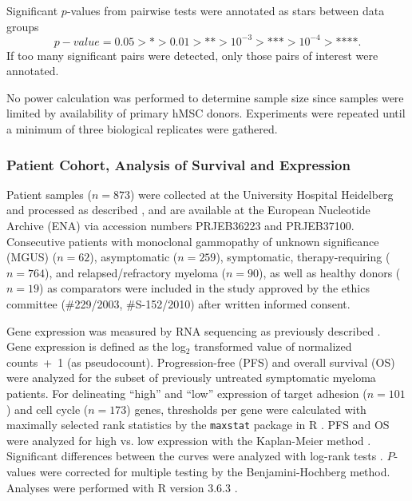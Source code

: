 Significant \(p\)-values from pairwise tests were annotated as stars between
data groups
\[ p-value = 0.05 > \text{*} > 0.01 > \text{**} > 10^{-3} >
    \text{***}> 10^{-4} > \text{****}. \]
If too many significant pairs were
detected, only those pairs of interest were annotated.

No power calculation was performed to determine sample size since samples were
limited by availability of primary hMSC donors. Experiments were repeated until
a minimum of three biological replicates were gathered.


\subsubsection*{Patient Cohort, Analysis of Survival and Expression}
Patient samples (\(n=873\)) were collected at the University Hospital Heidelberg
and processed as described
\cite{seckingerTargetExpressionGeneration2017b,seckingerCD38ImmunotherapeuticTarget2018},
and are available at the European Nucleotide Archive (ENA) via accession numbers
PRJEB36223 and PRJEB37100. Consecutive patients with monoclonal gammopathy of
unknown significance (MGUS) (\(n = 62\)), asymptomatic (\(n = 259\)),
symptomatic, therapy-requiring (\(n = 764\)), and relapsed/refractory myeloma
(\(n = 90\)), as well as healthy donors (\(n = 19\)) as comparators were
included in the study approved by the ethics committee (\#229/2003,
\#S-152/2010) after written informed consent.

Gene expression was measured by RNA sequencing as previously described
\cite{seckingerCD38ImmunotherapeuticTarget2018}. Gene expression is defined as
the log\(_2\) transformed value of normalized counts~+~1 (as pseudocount).
Progression-free (PFS) and overall survival (OS) were analyzed for the subset of
previously untreated symptomatic myeloma patients. For delineating “high” and
“low” expression of target adhesion (\(n=101\)) and cell cycle (\(n=173\))
genes, thresholds per gene were calculated with maximally selected rank
statistics by the \texttt{maxstat} package in R
\cite{hothornMaximallySelectedRank}. PFS and OS were analyzed for high
vs. low expression with the Kaplan-Meier method \cite{kaplanNonparametricEstimationIncomplete1958}.
Significant differences between the curves were analyzed with log-rank tests
\cite{harringtonClassRankTest1982}. \(P\)-values were corrected for multiple testing
by the Benjamini-Hochberg method. Analyses were performed with R version 3.6.3
\cite{rcoreteamLanguageEnvironmentStatistical2018}.
